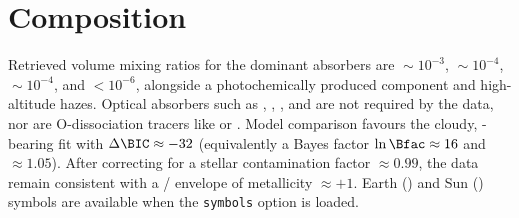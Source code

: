 \documentclass{article}
\begin{document}
\section{Composition}

Retrieved volume mixing ratios for the dominant absorbers are
\vmr{\HO}${}\sim10^{-3}$, \vmr{\COtwo}${}\sim10^{-4}$,
\vmr{\CO}${}\sim10^{-4}$, and \vmr{\CH}${}<10^{-6}$, alongside a
photochemically produced \SOtwo{} component and high-altitude hazes.
Optical absorbers such as \NaI, \KI, \TiO, and \VO{} are not required by
the data, nor are \Htwo{}O-dissociation tracers like \Hminus{} or
\eminus.  Model comparison favours the cloudy, \SOtwo-bearing fit with
$\Delta\BIC\approx-32$ (equivalently a Bayes factor $\ln\Bfac\approx16$
and \redchisq${}\approx1.05$).  After correcting for a stellar
contamination factor \fcont${}\approx0.99$, the data remain consistent
with a \Htwo/\Helium{} envelope of metallicity \FeH${}\approx+1$.  Earth
(\Earth) and Sun (\Sun) symbols are available when the \texttt{symbols}
option is loaded.
\end{document}
